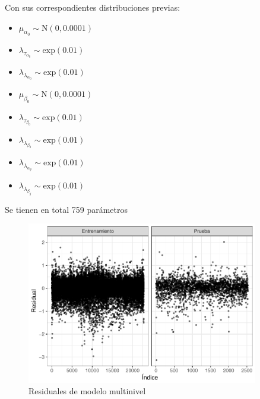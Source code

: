 Con sus correspondientes distribuciones previas:

\begin{itemize}

	\item $\mu_{\alpha_0} \sim \mathrm{N}(0, 0.0001)$
	
	\item $\lambda_{\tau_{\alpha_0}} \sim \mathrm{exp}(0.01)$
	
	\item $\lambda_{\lambda_{\alpha_0}} \sim \mathrm{exp}(0.01)$
	
	\item $\mu_{\beta_0} \sim \mathrm{N}(0, 0.0001)$
	
	\item $\lambda_{\tau_{\beta_0}} \sim \mathrm{exp}(0.01)$
	
	\item $\lambda_{\lambda_{\beta_0}} \sim \mathrm{exp}(0.01)$
	
	\item $\lambda_{\lambda_{\alpha_y}} \sim \mathrm{exp}(0.01)$
	
	\item $\lambda_{\lambda_{\beta_y}} \sim \mathrm{exp}(0.01)$
	
\end{itemize}

Se tienen en total 759 parámetros


\begin{figure}[H]
    \centering
    \includegraphics[width=0.9\textwidth]{images/three_levels_resids.pdf}
    \caption{Residuales de modelo multinivel}
    \label{fig:three_levels_resids}
\end{figure}

